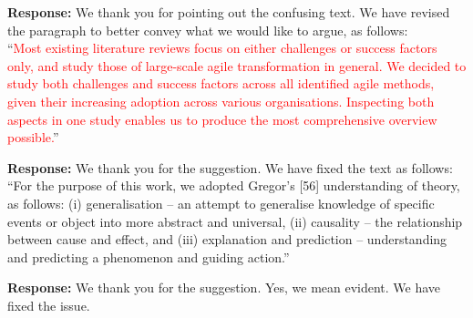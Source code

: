 \documentclass[a4paper,twoside,11pt]{reviewresponse}
\begin{document}
\textbf{Response:}
We thank you for pointing out the confusing text. We have revised the paragraph to better convey what we would like to argue, as follows:\\
``\textcolor{red}{Most existing literature reviews focus on either challenges or success factors only, and study those of large-scale agile transformation in general. We decided to study both challenges and success factors across all identified agile methods, given their increasing adoption across various organisations. Inspecting both aspects in one study enables us to produce the most comprehensive overview possible.}''

\textbf{Response:}
We thank you for the suggestion. We have fixed the text as follows:\\
``For the purpose of this work, we adopted Gregor's [56] understanding of theory, as follows: (i) generalisation -- an attempt to generalise knowledge of specific events or object into more abstract and universal, (ii) causality -- the relationship between cause and effect, and (iii) explanation and prediction -- understanding and predicting a phenomenon and guiding action.''

\textbf{Response:}
We thank you for the suggestion. Yes, we mean evident. We have fixed the issue.
\end{document}
